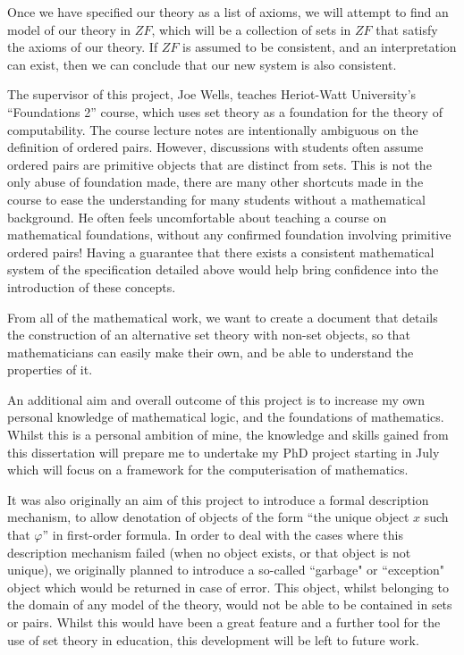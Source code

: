 \documentclass[11pt]{report}
\theoremstyle{definition}
\theoremstyle{theorem}
\theoremstyle{lemma}
\begin{document}
Once we have specified our theory as a list of axioms, we will attempt to find an model of our theory in $\mathit{ZF}$, which will be a collection of sets in $\mathit{ZF}$ that satisfy the axioms of our theory.
If $\mathit{ZF}$ is assumed to be consistent, and an interpretation can exist, then we can conclude that our new system is also consistent.

The supervisor of this project, Joe Wells, teaches Heriot-Watt University's ``Foundations 2'' course, which uses set theory as a foundation for the theory of computability.
The course lecture notes are intentionally ambiguous on the definition of ordered pairs. 
However, discussions with students often assume ordered pairs are primitive objects that are distinct from sets.
This is not the only abuse of foundation made, there are many other shortcuts made in the course to ease the understanding for many students without a mathematical background.  
He often feels uncomfortable about teaching a course on mathematical foundations, without any confirmed foundation involving primitive ordered pairs! 
Having a guarantee that there exists a consistent mathematical system of the specification detailed above would help bring confidence into the introduction of these concepts.

From all of the mathematical work, we want to create a document that details the construction of an alternative set theory with non-set objects, so that mathematicians can easily make their own, and be able to understand the properties of it.

An additional aim and overall outcome of this project is to increase my own personal knowledge of mathematical logic, and the foundations of mathematics.
Whilst this is a personal ambition of mine, the knowledge and skills gained from this dissertation will prepare me to undertake my PhD project starting in July which will focus on a framework for the computerisation of mathematics.

It was also originally an aim of this project to introduce a formal description mechanism, to allow denotation of objects of the form ``the unique object $x$ such that $\varphi$'' in first-order formula.
In order to deal with the cases where this description mechanism failed (when no object exists, or that object is not unique), we originally planned to introduce a so-called ``garbage" or ``exception" object which would be returned in case of error.
This object, whilst belonging to the domain of any model of the theory, would not be able to be contained in sets or pairs.
Whilst this would have been a great feature and a further tool for the use of set theory in education, this development will be left to future work.
\end{document}

